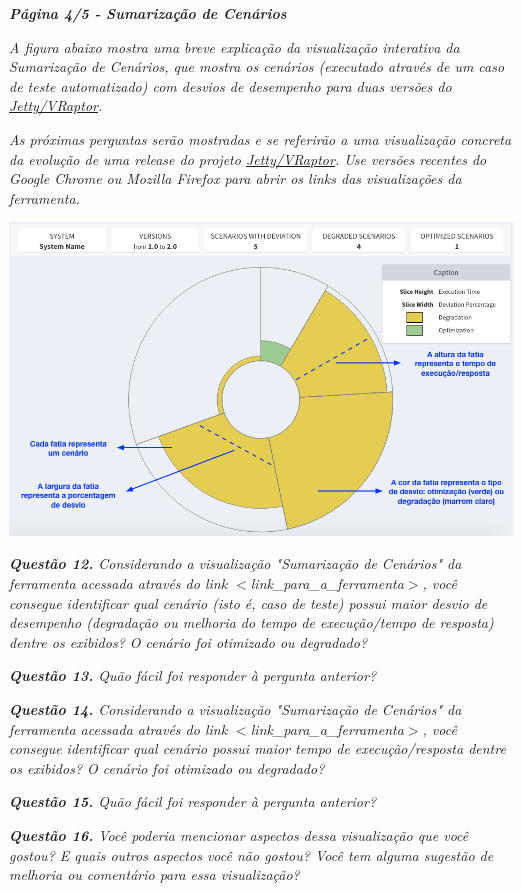 \begin{framed}
	\noindent \textit{\textbf{Página 4/5 - Sumarização de Cenários}}
	\par
	\noindent \textit{A figura abaixo mostra uma breve explicação da visualização interativa da Sumarização de Cenários, que mostra os cenários (executado através de um caso de teste automatizado) com desvios de desempenho para duas versões do \underline{Jetty/VRaptor}.}

	\noindent \textit{As próximas perguntas serão mostradas e se referirão a uma visualização concreta da evolução de uma release do projeto \underline{Jetty/VRaptor}. Use versões recentes do Google Chrome ou Mozilla Firefox para abrir os links das visualizações da ferramenta.}
	
   \includegraphics[scale=0.42]{Imagens/scenario_summarization_explicative_portuguese.png}

	\noindent \textit{\textbf{Questão 12.} Considerando a visualização "Sumarização de Cenários" da ferramenta acessada através do link {\(<\)}link\_para\_a\_ferramenta{\(>\)}, você consegue identificar qual cenário (isto é, caso de teste) possui maior desvio de desempenho (degradação ou melhoria do tempo de execução/tempo de resposta) dentre os exibidos? O cenário foi otimizado ou degradado?}
	\par
	\noindent \textit{\textbf{Questão 13.} Quão fácil foi responder à pergunta anterior?}
	\par
	\noindent \textit{\textbf{Questão 14.} Considerando a visualização "Sumarização de Cenários" da ferramenta acessada através do link {\(<\)}link\_para\_a\_ferramenta{\(>\)}, você consegue identificar qual cenário possui maior tempo de execução/resposta dentre os exibidos? O cenário foi otimizado ou degradado?}
	\par
	\noindent \textit{\textbf{Questão 15.} Quão fácil foi responder à pergunta anterior?}
	\par
	\noindent \textit{\textbf{Questão 16.} Você poderia mencionar aspectos dessa visualização que você gostou? E quais outros aspectos você não gostou? Você tem alguma sugestão de melhoria ou comentário para essa visualização?}
\end{framed}

